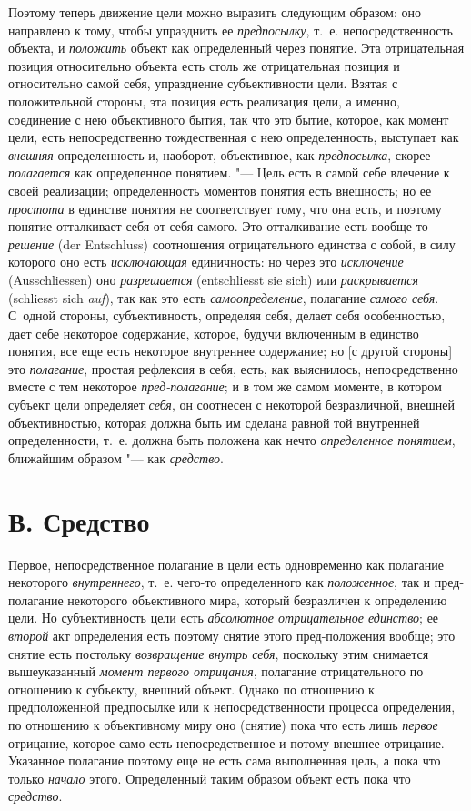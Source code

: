 Поэтому теперь движение цели можно выразить следующим образом:
оно направлено к тому, чтобы упразднить ее
{\em предпосылку}, т.~е.
непосредственность объекта, и
{\em положить} объект как
определенный через понятие. Эта отрицательная позиция относительно объекта
есть столь же отрицательная позиция и относительно самой себя, упразднение
субъективности цели. Взятая с положительной стороны, эта позиция есть
реализация цели, а именно, соединение с нею объективного бытия, так что это
бытие, которое, как момент цели, есть непосредственно тождественная с нею
определенность, выступает как
{\em внешняя}
определенность и, наоборот, объективное, как
{\em предпосылка}, скорее
{\em полагается} как
определенное понятием. "--- Цель есть в самой себе влечение к
своей реализации; определенность моментов понятия есть внешность; но ее
{\em простота} в единстве
понятия не соответствует тому, что она есть, и поэтому понятие отталкивает
себя от себя самого. Это отталкивание есть вообще то
{\em решение} (der Entschluss)
соотношения отрицательного единства с собой, в силу которого
оно есть {\em исключающая}
единичность: но через это
{\em исключение} (Ausschliessen)
оно {\em разрешается}
(entschliesst sie sich) или
{\em раскрывается} (schliesst sich
{\em auf}), так как это есть
{\em самоопределение},
полагание {\em самого
себя}. С~одной стороны, субъективность, определяя себя,
делает себя особенностью, дает себе некоторое содержание, которое, будучи
включенным в единство понятия, все еще есть некоторое внутреннее
содержание; но [с другой стороны] это
{\em полагание}, простая
рефлексия в себя, есть, как выяснилось, непосредственно вместе с тем
некоторое {\em пред-полагание};
и в том же самом моменте, в котором субъект цели определяет
{\em себя}, он соотнесен
с некоторой безразличной, внешней объективностью, которая должна быть им
сделана равной той внутренней определенности, т.~е. должна быть положена
как нечто {\em определенное понятием},
ближайшим образом "--- как
{\em средство}.

\section[В. Средство]{В. Средство}
Первое, непосредственное полагание в цели есть одновременно
как полагание некоторого
{\em внутреннего}, т.~е.
чего-то определенного как
{\em положенное}, так и
пред-полагание некоторого объективного мира, который безразличен к
определению цели. Но субъективность цели есть
{\em абсолютное отрицательное
единство}; ее
{\em второй} акт
определения есть поэтому снятие этого пред-положения вообще; это
снятие есть постольку
{\em возвращение внутрь себя},
поскольку этим снимается вышеуказанный
{\em момент первого отрицания},
полагание отрицательного по отношению к субъекту, внешний
объект. Однако по отношению к предположенной предпосылке или к
непосредственности процесса определения, по отношению к объективному миру
оно (снятие) пока что есть лишь
{\em первое} отрицание,
которое само есть непосредственное и потому внешнее отрицание. Указанное
полагание поэтому еще не есть сама выполненная цель, а пока что только
{\em начало} этого.
Определенный таким образом объект есть пока что
{\em средство}.

